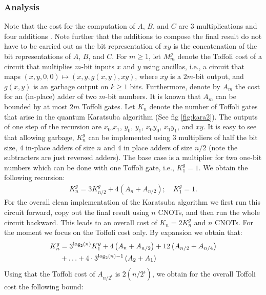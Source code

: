     \subsubsection{Analysis}
      Note that the cost for the computation of $A$, $B$, and $C$ are $3$ multiplications and four additions .
      Note further that the additions to compose the final result do not have to be carried out as the bit representation of $xy$ is the concatenation of the bit representations of $A$, $B$, and $C$.
      For $m\geq 1$, let $M^{g}_m$ denote the Toffoli cost of a circuit that multiplies $m$-bit inputs $x$ and $y$ using ancillas, i.e., a circuit that maps $(x, y, 0, 0) \mapsto (x, y, g(x,y), xy)$, where $xy$ is a $2m$-bit output, and $g(x,y)$ is an garbage output on $k\geq 1$ bits.
      Furthermore, denote by $A_m$ the cost for an (in-place) adder of two $m$-bit numbers.
      It is known that $A_m$ can be bounded by at most $2m$ Toffoli gates. Let $K_n$ denote the number of Toffoli gates that arise in the quantum Karatsuba algorithm (See fig \cref{fig:kara2}).
      The outputs of one step of the recursion are $x_0$,$x_1$, $y_0$, $y_1$, $x_0y_0$, $x_1 y_1$, and $xy$.
      It is easy to see that allowing garbage, $K_n^g$ can be implemented using $3$ multipliers of half the bit size, $4$ in-place adders of size $n$ and $4$ in place adders of size $n/2$ (note the subtracters are just reversed adders).
      The base case is a multiplier for two one-bit numbers which can be done with one Toffoli gate, i.e., $K_1^{g}=1$.
      We obtain the following recursion:
      \begin{align}
        K_n^{g} = 3 K_{n/2}^{g} + 4 \left(A_{n} + A_{n/2}\right); \quad K_1^{g}=1.
      \end{align}
      For the overall clean implementation of the Karatsuba algorithm we first run this circuit forward, copy out the final result using $n$ CNOTs, and then run the whole circuit backward.
      This leads to an overall cost of $K_n = 2 K_n^{g}$ and $n$ CNOTs.
      For the moment we focus on the Toffoli cost only.
      By expansion we obtain that:
      \begin{align}
        K_n^{g} &= 3^{\log_2(n)} K_1^{g} + 4\left( A_{n}+ A_{n/2} \right) + 12\left( A_{n/2}+ A_{n/4} \right)\notag\\
                & + \ldots + 4 \cdot 3^{\log_2(n)-1} \left(A_2 + A_1\right)
      \end{align}
      Using that the Toffoli cost of $A_{n/2^i}$ is $2(n/2^i)$, we obtain for the overall Toffoli cost the following bound:
